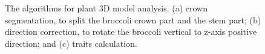 \begin{figure}[htbp!]
  \begin{center}
  \end{center}
  \caption[The algorithms for plant 3D model analysis]{
    The algorithms for plant 3D model analysis. (a) crown segmentation, to split the broccoli crown part and the stem part; (b) direction correction, to rotate the broccoli vertical to z-axis positive direction; and (c) traits calculation.
  }
  \label{fig:des_seg_alg}
\end{figure}